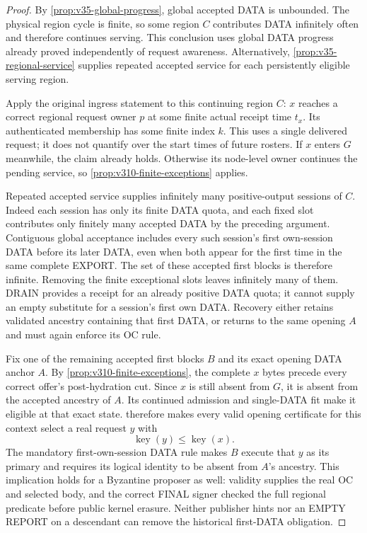 \begin{proof}
By \cref{prop:v35-global-progress}, global accepted DATA is unbounded.
The physical region cycle is finite, so some region $C$ contributes
DATA infinitely often and therefore continues serving. This conclusion
uses global DATA progress already proved independently of request
awareness. Alternatively, \cref{prop:v35-regional-service} supplies
repeated accepted service for each persistently eligible serving region.

Apply the original ingress statement to this continuing region $C$:
$x$ reaches a correct regional request owner $p$ at some finite actual
receipt time $t_x$. Its authenticated membership has some finite index
$k$. This uses a single delivered request; it does not quantify over the
start times of future rosters. If $x$ enters $G$ meanwhile, the claim
already holds. Otherwise its node-level owner continues the pending
service, so \cref{prop:v310-finite-exceptions} applies.

Repeated accepted service supplies infinitely many positive-output
sessions of $C$. Indeed each session has only its finite DATA quota,
and each fixed slot contributes only finitely many accepted DATA by
the preceding argument. Contiguous global acceptance includes every
such session's first own-session DATA before its later DATA, even when
both appear for the first time in the same complete EXPORT. The set of
these accepted first blocks is therefore infinite. Removing the finite
exceptional slots leaves infinitely many of them. DRAIN provides a
receipt for an already positive DATA quota; it cannot supply an empty
substitute for a session's first own DATA. Recovery either retains
validated ancestry containing that first DATA, or returns to the same
opening $A$ and must again enforce its OC rule.

Fix one of the remaining accepted first blocks $B$ and its exact
opening DATA anchor $A$. By \cref{prop:v310-finite-exceptions}, the
complete $x$ bytes precede every correct offer's post-hydration cut.
Since $x$ is still absent from $G$, it is absent from the accepted
ancestry of $A$. Its continued admission and single-DATA fit make it
eligible at that exact state.  therefore
makes every valid opening certificate for this context select a real
request $y$ with
\[
 \operatorname{key}(y)\le\operatorname{key}(x).
\]
The mandatory first-own-session DATA rule makes $B$ execute that $y$
as its primary and requires its logical identity to be absent from
$A$'s ancestry. This implication holds for a Byzantine proposer as
well: validity supplies the real OC and selected body, and the correct
FINAL signer checked the full regional predicate before public kernel
erasure. Neither publisher hints nor an EMPTY REPORT on a descendant
can remove the historical first-DATA obligation.


\end{proof}
